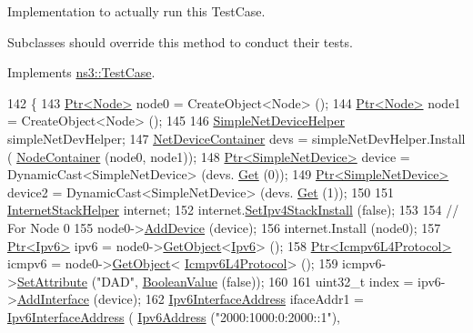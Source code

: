 Implementation to actually run this Test\+Case. 

Subclasses should override this method to conduct their tests. 

Implements \hyperlink{classns3_1_1TestCase_a8ff74680cf017ed42011e4be51917a24}{ns3\+::\+Test\+Case}.


\begin{DoxyCode}
142 \{
143   \hyperlink{classns3_1_1Ptr}{Ptr<Node>} node0 = CreateObject<Node> ();
144   \hyperlink{classns3_1_1Ptr}{Ptr<Node>} node1 = CreateObject<Node> ();
145 
146   \hyperlink{classns3_1_1SimpleNetDeviceHelper}{SimpleNetDeviceHelper} simpleNetDevHelper;
147   \hyperlink{classns3_1_1NetDeviceContainer}{NetDeviceContainer} devs = simpleNetDevHelper.Install (
      \hyperlink{classns3_1_1NodeContainer}{NodeContainer} (node0, node1));
148   \hyperlink{classns3_1_1Ptr}{Ptr<SimpleNetDevice>} device = DynamicCast<SimpleNetDevice> (devs.
      \hyperlink{classns3_1_1NetDeviceContainer_a677d62594b5c9d2dea155cc5045f4d0b}{Get} (0));
149   \hyperlink{classns3_1_1Ptr}{Ptr<SimpleNetDevice>} device2 = DynamicCast<SimpleNetDevice> (devs.
      \hyperlink{classns3_1_1NetDeviceContainer_a677d62594b5c9d2dea155cc5045f4d0b}{Get} (1));
150 
151   \hyperlink{classns3_1_1InternetStackHelper}{InternetStackHelper} internet;
152   internet.\hyperlink{classns3_1_1InternetStackHelper_a10e2a35f410d0d1c90d979542c8bfd6e}{SetIpv4StackInstall} (\textcolor{keyword}{false});
153 
154   \textcolor{comment}{// For Node 0}
155   node0->\hyperlink{classns3_1_1Node_a42ff83ee1d5d1649c770d3f5b62375de}{AddDevice} (device);
156   internet.Install (node0);
157   \hyperlink{classns3_1_1Ptr}{Ptr<Ipv6>} ipv6 = node0->\hyperlink{classns3_1_1Object_a13e18c00017096c8381eb651d5bd0783}{GetObject}<\hyperlink{classns3_1_1Ipv6}{Ipv6}> ();
158   \hyperlink{classns3_1_1Ptr}{Ptr<Icmpv6L4Protocol>} icmpv6 = node0->\hyperlink{classns3_1_1Object_a13e18c00017096c8381eb651d5bd0783}{GetObject}<
      \hyperlink{classns3_1_1Icmpv6L4Protocol}{Icmpv6L4Protocol}> ();
159   icmpv6->\hyperlink{classns3_1_1ObjectBase_ac60245d3ea4123bbc9b1d391f1f6592f}{SetAttribute} (\textcolor{stringliteral}{"DAD"}, \hyperlink{classns3_1_1BooleanValue}{BooleanValue} (\textcolor{keyword}{false}));
160 
161   uint32\_t index = ipv6->\hyperlink{classns3_1_1Ipv6_a4fd7da82c16b8abf9ca15f982918e6a4}{AddInterface} (device);
162   \hyperlink{classns3_1_1Ipv6InterfaceAddress}{Ipv6InterfaceAddress} ifaceAddr1 = \hyperlink{classns3_1_1Ipv6InterfaceAddress}{Ipv6InterfaceAddress} (
      \hyperlink{classns3_1_1Ipv6Address}{Ipv6Address} (\textcolor{stringliteral}{"2000:1000:0:2000::1"}),

\end{DoxyCode}
